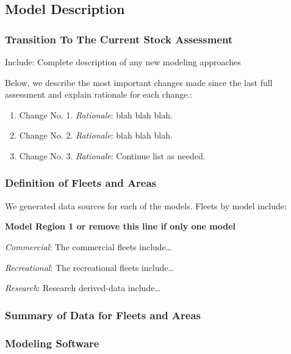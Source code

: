 \documentclass[12pt,]{article}
\begin{document}
\subsection{Model Description}\label{model-description}

\subsubsection{Transition To The Current Stock
Assessment}\label{transition-to-the-current-stock-assessment}

Include: Complete description of any new modeling approaches

Below, we describe the most important changes made since the last full
assessment and explain rationale for each change.:

\begin{enumerate}
\def\labelenumi{\arabic{enumi}.}
\item
  Change No. 1. \emph{Rationale}: blah blah blah.
\item
  Change No. 2. \emph{Rationale}: blah blah blah.
\item
  Change No. 3. \emph{Rationale}: Continue list as needed.
\end{enumerate}

\subsubsection{Definition of Fleets and
Areas}\label{definition-of-fleets-and-areas}

We generated data sources for each of the models. Fleets by model
include:

\textbf{Model Region 1 or remove this line if only one model}

\emph{Commercial}: The commercial fleets include\ldots{}

\emph{Recreational}: The recreational fleets include\ldots{}

\emph{Research}: Research derived-data include\ldots{}

\subsubsection{Summary of Data for Fleets and
Areas}\label{summary-of-data-for-fleets-and-areas}

\subsubsection{Modeling Software}\label{modeling-software}
\end{document}
